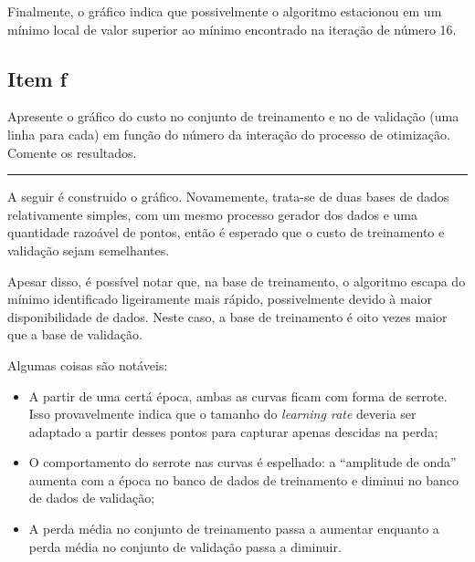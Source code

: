 \documentclass[
  a4paperpaper,
]{article}
\providecommand{\tightlist}{%
  \setlength{\itemsep}{0pt}\setlength{\parskip}{0pt}}\usepackage{longtable,booktabs,array}
\begin{document}
Finalmente, o gráfico indica que possivelmente o algoritmo estacionou em
um mínimo local de valor superior ao mínimo encontrado na iteração de
número 16.

\subsection{Item f}\label{item-f}

Apresente o gráfico do custo no conjunto de treinamento e no de
validação (uma linha para cada) em função do número da interação do
processo de otimização. Comente os resultados.

\begin{center}\rule{0.5\linewidth}{0.5pt}\end{center}

A seguir é construido o gráfico. Novamemente, trata-se de duas bases de
dados relativamente simples, com um mesmo processo gerador dos dados e
uma quantidade razoável de pontos, então é esperado que o custo de
treinamento e validação sejam semelhantes.

Apesar disso, é possível notar que, na base de treinamento, o algoritmo
escapa do mínimo identificado ligeiramente mais rápido, possivelmente
devido à maior disponibilidade de dados. Neste caso, a base de
treinamento é oito vezes maior que a base de validação.

Algumas coisas são notáveis:

\begin{itemize}
\tightlist
\item
  A partir de uma certá época, ambas as curvas ficam com forma de
  serrote. Isso provavelmente indica que o tamanho do \emph{learning
  rate} deveria ser adaptado a partir desses pontos para capturar apenas
  descidas na perda;
\item
  O comportamento do serrote nas curvas é espelhado: a ``amplitude de
  onda'' aumenta com a época no banco de dados de treinamento e diminui
  no banco de dados de validação;
\item
  A perda média no conjunto de treinamento passa a aumentar enquanto a
  perda média no conjunto de validação passa a diminuir.
\end{itemize}
\end{document}
